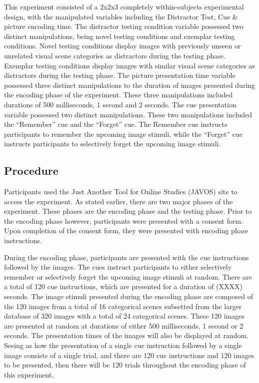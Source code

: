 \documentclass[
  man,floatsintext]{apa6}
\begin{document}
This experiment consisted of a 2x2x3 completely within-subjects experimental design, with the manipulated variables including the Distractor Test, Cue \& picture encoding time. The distractor testing condition variable possessed two distinct manipulations, being novel testing conditions and exemplar testing conditions. Novel testing conditions display images with previously unseen or unrelated visual scene categories as distractors during the testing phase. Exemplar testing conditions display images with similar visual scene categories as distractors during the testing phase. The picture presentation time variable possessed three distinct manipulations to the duration of images presented during the encoding phase of the experiment. These three manipulations included durations of 500 milliseconds, 1 second and 2 seconds. The cue presentation variable possessed two distinct manipulations. These two manipulations included the ``Remember'' cue and the ``Forget'' cue. The Remember cue instructs participants to remember the upcoming image stimuli, while the ``Forget'' cue instructs participants to selectively forget the upcoming image stimuli.

\hypertarget{procedure}{%
\subsection{Procedure}\label{procedure}}

Participants used the Just Another Tool for Online Studies (JAVOS) site to access the experiment. As stated earlier, there are two major phases of the experiment. These phases are the encoding phase and the testing phase. Prior to the encoding phase however, participants were presented with a consent form. Upon completion of the consent form, they were presented with encoding phase instructions.

During the encoding phase, participants are presented with the cue instructions followed by the images. The cues instruct participants to either selectively remember or selectively forget the upcoming image stimuli at random. There are a total of 120 cue instructions, which are presented for a duration of (XXXX) seconds. The image stimuli presented during the encoding phase are composed of the 120 images from a total of 16 categorical scenes subsetted from the larger database of 320 images with a total of 24 categorical scenes. These 120 images are presented at random at durations of either 500 milliseconds, 1 second or 2 seconds. The presentation times of the images will also be displayed at random. Seeing as how the presentation of a single cue instruction followed by a single image consists of a single trial, and there are 120 cue instructions and 120 images to be presented, then there will be 120 trials throughout the encoding phase of this experiment.
\end{document}
